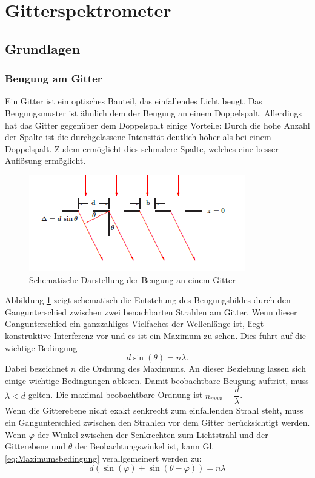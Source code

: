 \documentclass[12pt,a4paper]{article}
\begin{document}
\newpage
\section{Gitterspektrometer}

\subsection{Grundlagen}
\subsubsection{Beugung am Gitter}
Ein Gitter ist ein optisches Bauteil, das einfallendes Licht beugt. Das Beugungsmuster ist ähnlich dem der Beugung an einem Doppelspalt. Allerdings hat das Gitter gegenüber dem Doppelspalt einige Vorteile: Durch die hohe Anzahl der Spalte ist die durchgelassene Intensität deutlich höher als bei einem Doppelspalt. Zudem ermöglicht dies schmalere Spalte, welches eine besser Auflösung ermöglicht.\\
\begin{figure}
\begin{center}
\includegraphics[scale=1.2]{Bilder/Gitterbeugung_Schema.PNG}
\end{center}
\caption[Gitterbeugung Schema]{Schematische Darstellung der Beugung an einem Gitter}
\label{fig:Gitterbeugung_Schema}
\end{figure}
Abbildung \ref{fig:Gitterbeugung_Schema} zeigt schematisch die Entstehung des Beugungsbildes durch den Gangunterschied zwischen zwei benachbarten Strahlen am Gitter. Wenn dieser Gangunterschied ein ganzzahliges Vielfaches der Wellenlänge ist, liegt konstruktive Interferenz vor und es ist ein Maximum zu sehen. Dies führt auf die wichtige Bedingung
\begin{equation}
d \sin (\theta) = n \lambda.
\label{eq:Maximumsbedingung}
\end{equation}
Dabei bezeichnet $n$ die Ordnung des Maximums. An dieser Beziehung lassen sich einige wichtige Bedingungen ablesen. Damit beobachtbare Beugung auftritt, muss $\lambda < d$ gelten. Die maximal beobachtbare Ordnung ist $n_{max} = \dfrac{d}{\lambda}$. \\
Wenn die Gitterebene nicht exakt senkrecht zum einfallenden Strahl steht, muss ein Gangunterschied zwischen den Strahlen vor dem Gitter berücksichtigt werden. Wenn $\varphi$ der Winkel zwischen der Senkrechten zum Lichtstrahl und der Gitterebene und $\theta$ der Beobachtungswinkel ist, kann Gl. \ref{eq:Maximumsbedingung} verallgemeinert werden zu:
\begin{equation}
d(\sin(\varphi) + \sin(\theta - \varphi)) = n \lambda
\label{eq:VerallgemeinerteMaximumsbedingung}
\end{equation}
\end{document}
